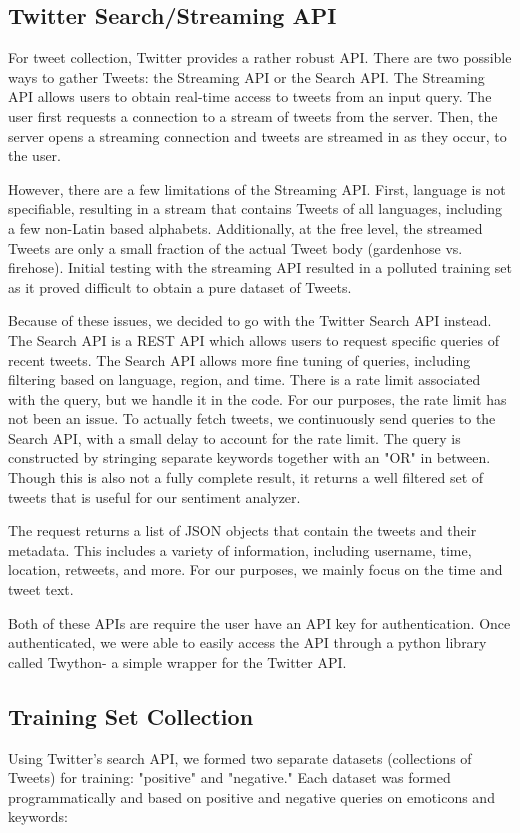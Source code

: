 \documentclass[preprint,pre,floats,aps,amsmath,amssymb,12pt]{revtex4}
\begin{document}
\subsection{Twitter Search/Streaming API}
For tweet collection, Twitter provides a rather robust API. There are two possible ways to gather Tweets: the Streaming API or the Search API. The Streaming API allows users to obtain real-time access to tweets from an input query. The user first requests a connection to a stream of tweets from the server. Then, the server opens a streaming connection and tweets are streamed in as they occur, to the user. 

However, there are a few limitations of the Streaming API. First, language is not specifiable, resulting in a stream that contains Tweets of all languages, including a few non-Latin based alphabets. Additionally, at the free level, the streamed Tweets are only a small fraction of the actual Tweet body (gardenhose vs. firehose). Initial testing with the streaming API resulted in a polluted training set as it proved difficult to obtain a pure dataset of Tweets.

Because of these issues, we decided to go with the Twitter Search API instead. The Search API is a REST API which allows users to request specific queries of recent tweets. The Search API allows more fine tuning of queries, including filtering based on language, region, and time. There is a rate limit associated with the query, but we handle it in the code. For our purposes, the rate limit has not been an issue. To actually fetch tweets, we continuously send queries to the Search API, with a small delay to account for the rate limit. The query is constructed by stringing separate keywords together with an "OR" in between. Though this is also not a fully complete result, it returns a well filtered set of tweets that is useful for our sentiment analyzer. 

The request returns a list of JSON objects that contain the tweets and their metadata. This includes a variety of information, including username, time, location, retweets, and more. For our purposes, we mainly focus on the time and tweet text. 

Both of these APIs are require the user have an API key for authentication. Once authenticated, we were able to easily access the API through a python library called Twython- a simple wrapper for the Twitter API.

\subsection{Training Set Collection}
Using Twitter's search API, we formed two separate datasets (collections of Tweets) for training: "positive" and "negative." Each dataset was formed programmatically and based on positive and negative queries on emoticons and keywords:
\end{document}
